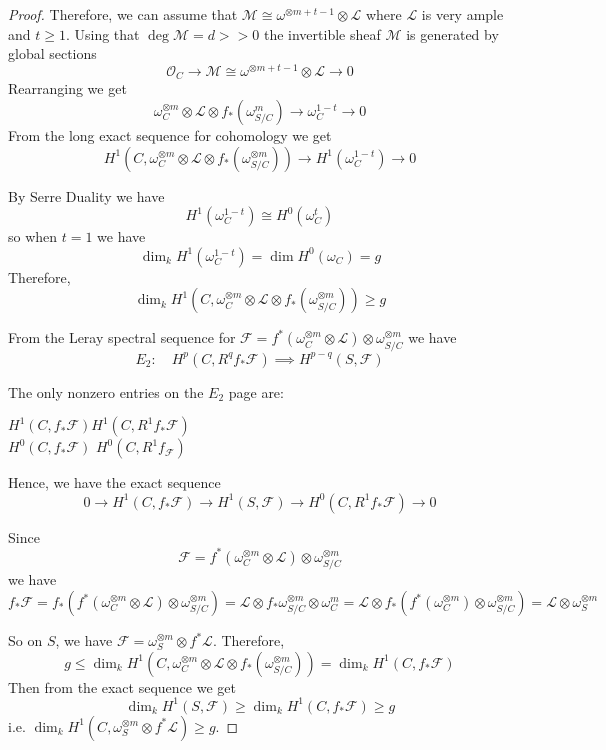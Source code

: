 \begin{proof}
Therefore, we can assume that $\mathcal{M}\cong \omega^{\otimes m+t-1}\otimes \mathcal{L}$ where $\mathcal{L}$ is very ample and $t\geq 1$. Using that $\deg \mathcal{M}=d>>0$ the invertible sheaf $\mathcal{M}$ is generated by global sections $$\mathcal{O}_{C}\to \mathcal{M}\cong \omega^{\otimes m+t-1}\otimes \mathcal{L}\to 0$$ Rearranging we get $$\omega_C^{\otimes m}\otimes \mathcal{L} \otimes f_*(\omega^m_{S/C})\to \omega_C^{1-t}\to 0$$ From the long exact sequence for cohomology we get $$H^1(C, \omega^{\otimes m}_C\otimes \mathcal{L}\otimes f_*(\omega^{\otimes m}_{S/C}))\to H^1(\omega_C^{1-t})\to 0$$

By Serre Duality we have $$H^1(\omega_C^{1-t})\cong H^0(\omega_C^t)$$ so when $t=1$ we have $$\dim_k H^1(\omega_C^{1-t})=\dim H^0(\omega_C)=g$$ Therefore, $$\dim_k H^1(C, \omega^{\otimes m}_C\otimes \mathcal{L}\otimes f_*(\omega^{\otimes m}_{S/C}))\geq g$$

From the Leray spectral sequence for $\mathcal{F}=f^*(\omega^{\otimes m}_C\otimes \mathcal{L})\otimes \omega^{\otimes m}_{S/C}$ we have $$E_2: \quad H^p(C, R^qf_*\mathcal{F})\implies H^{p-q}(S,\mathcal{F})$$

The only nonzero entries on the $E_2$ page are:
\begin{center}
$H^1(C, f_*\mathcal{F})$\quad  \quad $H^1(C, R^1f_*\mathcal{F})$\\
$H^0(C, f_*\mathcal{F})$ \quad \quad $H^0(C,R^1f_\mathcal{F})$
\end{center}

Hence, we have the exact sequence $$0\to H^1(C, f_*\mathcal{F})\to H^1(S, \mathcal{F})\to H^0(C, R^1f_*\mathcal{F})\to 0$$

Since $$\mathcal{F}=f^*(\omega^{\otimes m}_C\otimes \mathcal{L})\otimes \omega^{\otimes m}_{S/C}$$ we have $$f_*\mathcal{F}=f_*(f^*(\omega^{\otimes m}_C\otimes \mathcal{L})\otimes \omega^{\otimes m}_{S/C})=\mathcal{L}\otimes f_*\omega^{\otimes m}_{S/C}\otimes \omega^m_C=\mathcal{L}\otimes f_*(f^*(\omega^{\otimes m}_C)\otimes \omega^{\otimes m}_{S/C})=\mathcal{L}\otimes \omega^{\otimes m}_S$$

So on $S$, we have $\mathcal{F}=\omega_S^{\otimes m}\otimes f^*\mathcal{L}$. Therefore, $$g\leq \dim_k H^1(C, \omega^{\otimes m}_C\otimes \mathcal{L}\otimes f_*(\omega^{\otimes m}_{S/C}))=\dim_k H^1(C, f_*\mathcal{F})$$ Then from the exact sequence we get $$\dim_k H^1(S,\mathcal{F})\geq \dim_k H^1(C, f_*\mathcal{F})\geq g$$ i.e. $\dim_k H^1(C, \omega_S^{\otimes m}\otimes f^*\mathcal{L})\geq g$.


\end{proof}
